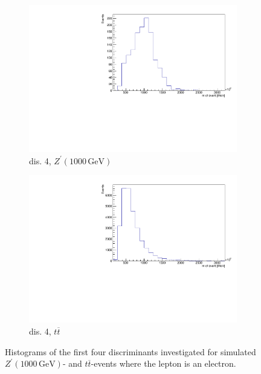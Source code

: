 \begin{figure}[H]
  \begin{subfigure}{0.45\textwidth}%
    \centering%
    \includegraphics[width=\textwidth]{plots/discriminant/zprime1000.el_dis4.pdf}%
    \caption{dis. 4, $Z^\prime(1000 \, \si{\giga\eV})$}%
    \label{fig:5g}%
  \end{subfigure}%
  \hfill
  \begin{subfigure}{0.45\textwidth}%
    \centering%
    \includegraphics[width=\textwidth]{plots/discriminant/ttbar.el_dis4.pdf}%
    \caption{dis. 4, $t \overline{t}$}%
    \label{fig:5h}%
  \end{subfigure}%
  \caption{Histograms of the first four discriminants investigated for simulated $Z^\prime(1000 \, \si{\giga\eV})$- and $t \overline{t}$-events where the lepton
  is an electron.}%
  \label{fig:5}%
\end{figure}

